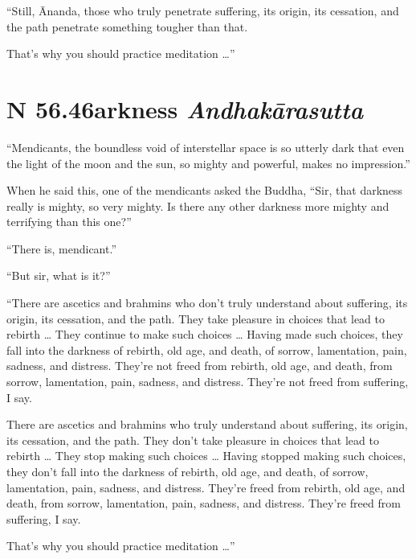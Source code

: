\documentclass[12pt,openany]{book}%
\newcommand*{\suttatitleacronym}[1]{\smaller[2]{#1}\vspace*{.3em}}
\newcommand*{\suttatitletranslation}[1]{\linebreak{#1}}
\newcommand*{\suttatitleroot}[1]{\linebreak\smaller[2]\itshape{#1}}
\newcommand*{\tocacronym}[1]{\hspace*{-3.3em}{#1}\quad}
\newcommand*{\toctranslation}[1]{#1}
\newcommand*{\tocroot}[1]{(\textit{#1})}
\begin{document}
“Still, Ānanda, those who truly penetrate suffering, its origin, its cessation, and the path penetrate something tougher than that. 

That’s why you should practice meditation …” 

%
\section*{{\suttatitleacronym SN 56.46}{\suttatitletranslation Darkness }{\suttatitleroot Andhakārasutta}}
\addcontentsline{toc}{section}{\tocacronym{SN 56.46} \toctranslation{Darkness } \tocroot{Andhakārasutta}}

“Mendicants, the boundless void of interstellar space is so utterly dark that even the light of the moon and the sun, so mighty and powerful, makes no impression.” 

When he said this, one of the mendicants asked the Buddha, “Sir, that darkness really is mighty, so very mighty. Is there any other darkness more mighty and terrifying than this one?” 

“There is, mendicant.” 

“But sir, what is it?” 

“There are ascetics and brahmins who don’t truly understand about suffering, its origin, its cessation, and the path. They take pleasure in choices that lead to rebirth … They continue to make such choices … Having made such choices, they fall into the darkness of rebirth, old age, and death, of sorrow, lamentation, pain, sadness, and distress. They’re not freed from rebirth, old age, and death, from sorrow, lamentation, pain, sadness, and distress. They’re not freed from suffering, I say. 

There are ascetics and brahmins who truly understand about suffering, its origin, its cessation, and the path. They don’t take pleasure in choices that lead to rebirth … They stop making such choices … Having stopped making such choices, they don’t fall into the darkness of rebirth, old age, and death, of sorrow, lamentation, pain, sadness, and distress. They’re freed from rebirth, old age, and death, from sorrow, lamentation, pain, sadness, and distress. They’re freed from suffering, I say. 

That’s why you should practice meditation …” 
\end{document}
